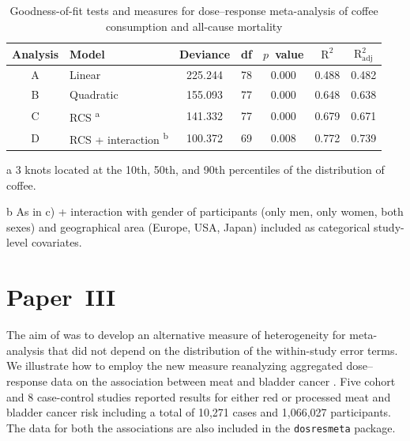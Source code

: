 \documentclass[11pt,a4paper,twoside,openany]{book}\usepackage{knitr}
\begin{document}
{\begin{table}[!h]

\begin{threeparttable}
\caption{\label{tab:gof_tab}Goodness-of-fit tests and measures for dose--response meta-analysis of coffee consumption and all-cause mortality \citep{crippa2014coffee}}
\centering
\begin{tabular}[t]{c>{\centering\arraybackslash}p{5.8cm}ccccc}
\toprule
Analysis & Model & Deviance & df & $p$~value & \textrm{$\mathrm{R^2}$} & \textrm{$\mathrm{R_{\textrm{adj}}^2}$}\\
\midrule
A & Linear & 225.244 & 78 & 0.000 & 0.488 & 0.482\\
B & Quadratic & 155.093 & 77 & 0.000 & 0.648 & 0.638\\
C & RCS \textsuperscript{a} & 141.332 & 77 & 0.000 & 0.679 & 0.671\\
D & RCS + interaction \textsuperscript{b} & 100.372 & 69 & 0.008 & 0.772 & 0.739\\
\bottomrule
\end{tabular}
\begin{tablenotes}
\small
\item[a] 3 knots located at the 10th, 50th, and 90th percentiles of the distribution of coffee.
\item[b] As in c) + interaction with gender of participants (only men, only women, both sexes) and geographical area (Europe, USA, Japan) included as categorical study-level covariates.
\end{tablenotes}
\end{threeparttable}
\end{table}




\section{Paper~III}\label{sec:res_paperIII}



The aim of  was to develop an alternative measure of heterogeneity for meta-analysis that did not depend on the distribution of the within-study error terms. We illustrate how to employ the new measure reanalyzing aggregated dose--response data on the association between meat and bladder cancer \citep{crippa2016red}. Five cohort and 8 case-control studies reported results for either red or processed meat and bladder cancer risk including a total of 10,271 cases and 1,066,027 participants. The data for both the associations are also included in the \texttt{dosresmeta} package.

}
\end{document}
